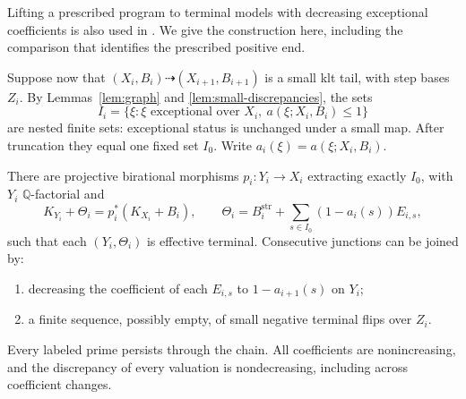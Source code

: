 Lifting a prescribed program to terminal models with decreasing
exceptional coefficients is also used in
\cite[Lemma~2.8]{HanLiuZhuang2025}. We give the construction here,
including the comparison that identifies the prescribed positive end.

Suppose now that
$(X_i,B_i)\dashrightarrow(X_{i+1},B_{i+1})$
is a small klt tail, with step bases $Z_i$.
By Lemmas~\ref{lem:graph} and \ref{lem:small-discrepancies}, the sets
\[
 I_i=\{\xi:\xi\text{ exceptional over }X_i,\ a(\xi;X_i,B_i)\leq1\}
\]
are nested finite sets: exceptional status is unchanged under a small map. After truncation they equal one fixed set $I_0$. Write $a_i(\xi)=a(\xi;X_i,B_i)$.

\begin{proposition}\label{prop:terminal-chain}
There are projective birational morphisms $p_i:Y_i\to X_i$ extracting exactly $I_0$, with $Y_i$ $\mathbb Q$-factorial and
\begin{equation}\label{eq:terminal-crepant}
 K_{Y_i}+\Theta_i=p_i^*(K_{X_i}+B_i),\qquad
 \Theta_i=B_i^{\mathrm{str}}+
       \sum_{s\in I_0}(1-a_i(s))E_{i,s},
\end{equation}
such that each $(Y_i,\Theta_i)$ is effective terminal. Consecutive junctions can be joined by:
\begin{enumerate}[label=\textup{(\roman*)}]
\item decreasing the coefficient of each $E_{i,s}$ to $1-a_{i+1}(s)$ on $Y_i$;
\item a finite sequence, possibly empty, of small negative terminal flips over $Z_i$.
\end{enumerate}
Every labeled prime persists through the chain. All coefficients are nonincreasing, and the discrepancy of every valuation is nondecreasing, including across coefficient changes.
\end{proposition}

